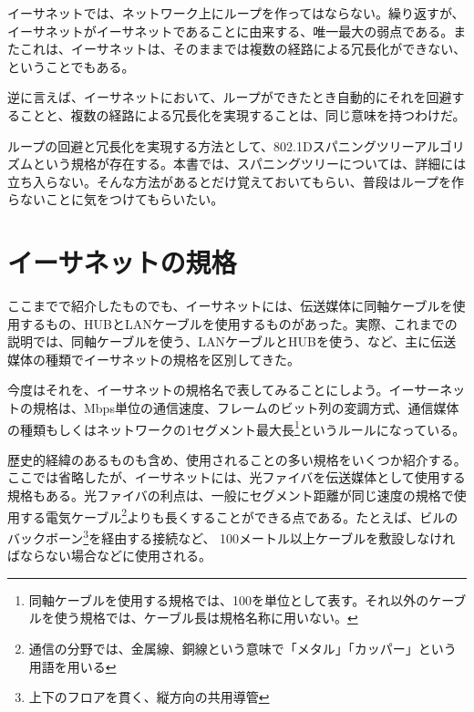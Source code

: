 イーサネットでは、ネットワーク上にループを作ってはならない。繰り返すが、イーサネットがイーサネットであることに由来する、唯一最大の弱点である。またこれは、イーサネットは、そのままでは複数の経路による冗長化ができない、ということでもある。

逆に言えば、イーサネットにおいて、ループができたとき自動的にそれを回避することと、複数の経路による冗長化を実現することは、同じ意味を持つわけだ。

ループの回避と冗長化を実現する方法として、802.1Dスパニングツリーアルゴリズムという規格が存在する。本書では、スパニングツリーについては、詳細には立ち入らない。そんな方法があるとだけ覚えておいてもらい、普段はループを作らないことに気をつけてもらいたい。

\section{イーサネットの規格}

ここまでで紹介したものでも、イーサネットには、伝送媒体に同軸ケーブルを使用するもの、HUBとLANケーブルを使用するものがあった。実際、これまでの説明では、同軸ケーブルを使う、LANケーブルとHUBを使う、など、主に伝送媒体の種類でイーサネットの規格を区別してきた。

今度はそれを、イーサネットの規格名で表してみることにしよう。イーサーネットの規格は、Mbps単位の通信速度、フレームのビット列の変調方式、通信媒体の種類もしくはネットワークの1セグメント最大長\footnote{同軸ケーブルを使用する規格では、100を単位として表す。それ以外のケーブルを使う規格では、ケーブル長は規格名称に用いない。}というルールになっている。

歴史的経緯のあるものも含め、使用されることの多い規格をいくつか紹介する。ここでは省略したが、イーサネットには、光ファイバを伝送媒体として使用する規格もある。光ファイバの利点は、一般にセグメント距離が同じ速度の規格で使用する電気ケーブル\footnote{通信の分野では、金属線、銅線という意味で「メタル」「カッパー」という用語を用いる}よりも長くすることができる点である。たとえば、ビルのバックボーン\footnote{上下のフロアを貫く、縦方向の共用導管}を経由する接続など、 100メートル以上ケーブルを敷設しなければならない場合などに使用される。

